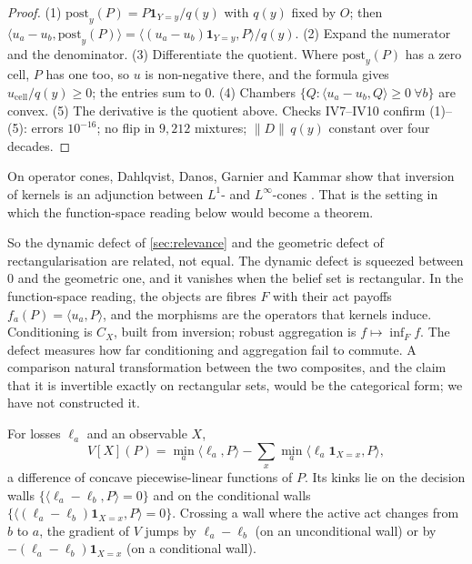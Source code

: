 \begin{proof}
(1) $\mathrm{post}_y(P)=P\mathbf 1_{Y=y}/q(y)$ with $q(y)$ fixed by $O$; then $\langle u_a-u_b,\mathrm{post}_y(P)\rangle=\langle(u_a-u_b)\mathbf 1_{Y=y},P\rangle/q(y)$.
(2) Expand the numerator and the denominator. (3) Differentiate the quotient. Where $\mathrm{post}_y(P)$ has a zero cell, $P$ has one too,
so $u$ is non-negative there, and the formula gives $u_{\text{cell}}/q(y)\ge0$; the entries sum to $0$. (4) Chambers
$\{Q:\langle u_a-u_b,Q\rangle\ge0\ \forall b\}$ are convex. (5) The derivative is the quotient above. Checks IV7--IV10 confirm (1)--(5): errors
$10^{-16}$; no flip in $9{,}212$ mixtures; $\|D\|\,q(y)$ constant over four decades.
\end{proof}

On operator cones, Dahlqvist, Danos, Garnier and Kammar show that inversion of kernels is an adjunction between $L^1$- and $L^\infty$-cones
\cite{DahlqvistDanosGarnierKammar2016}. That is the setting in which the function-space reading below would become a theorem.

So the dynamic defect of \cref{sec:relevance} and the geometric defect of rectangularisation are related, not equal. The dynamic defect is
squeezed between $0$ and the geometric one, and it vanishes when the belief set is rectangular. In the function-space reading, the objects
are fibres $F$ with their act payoffs $f_a(P)=\langle u_a,P\rangle$, and the morphisms are the operators that kernels induce. Conditioning is
$C_X$, built from inversion; robust aggregation is $f\mapsto\inf_Ff$. The defect measures how far conditioning and aggregation fail to
commute. A comparison natural transformation between the two composites, and the claim that it is invertible exactly on rectangular
sets, would be the categorical form; we have not constructed it.

\begin{proposition}\label{prop:wallcross}
For losses $\ell_a$ and an observable $X$,
\[
V[X](P)=\min_a\langle\ell_a,P\rangle-\sum_x\min_a\langle\ell_a\mathbf 1_{X=x},P\rangle ,
\]
a difference of concave piecewise-linear functions of $P$. Its kinks lie on the decision walls $\{\langle\ell_a-\ell_b,P\rangle=0\}$ and on
the conditional walls $\{\langle(\ell_a-\ell_b)\mathbf 1_{X=x},P\rangle=0\}$. Crossing a wall where the active act changes from $b$ to $a$, the gradient
of $V$ jumps by $\ell_a-\ell_b$ (on an unconditional wall) or by $-(\ell_a-\ell_b)\mathbf 1_{X=x}$ (on a conditional wall).
\end{proposition}

